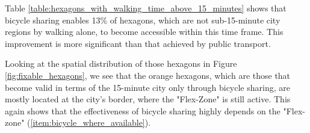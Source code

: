 Table \ref{table:hexagons_with_walking_time_above_15_minutes} shows that bicycle sharing enables 13\% of hexagons, which are not sub-15-minute city regions by walking alone, to become accessible within this time frame. 
This improvement is more significant than that achieved by public transport.

Looking at the spatial distribution of those hexagons in Figure \ref{fig:fixable_hexagons}, we see that the orange hexagons, which are those that become valid in terms of the 15-minute city only through bicycle sharing, are mostly located at the city's border, where the "Flex-Zone" is still active.
This again shows that the effectiveness of bicycle sharing highly depends on the "Flex-zone" (\ref{item:bicycle_where_available}).






